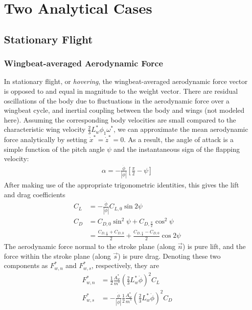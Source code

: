 \documentclass[11pt,letterpaper]{article}
\begin{document}
\section{Two Analytical Cases}

\subsection{Stationary Flight}\label{sec:analytical-hover}

\subsubsection{Wingbeat-averaged Aerodynamic Force}\label{sec:hover-force}

In stationary flight, or \emph{hovering}, the wingbeat-averaged
aerodynamic force vector is opposed to and equal in magnitude to
the weight vector. There are residual oscillations of the body
due to fluctuations in the aerodynamic force over a wingbeat cycle,
and inertial coupling between the body and wings (not modeled here).
Assuming the corresponding body velocities are small compared to the
characteristic wing velocity $\frac23 L_w^* \phi_1 \omega^*$, we can approximate
the mean aerodynamic force analytically by setting $\dot{x}^* = \dot{z}^* = 0$.
As a result, the angle of attack is a simple function of the pitch
angle $\psi$ and the instantaneous sign of the flapping velocity:
\begin{align}
    \alpha = - \frac{\dot{\phi}}{|\dot{\phi}|} \left[ \frac{\pi}{2} - \psi \right]
\end{align}
After making use of the appropriate trigonometric identities, this
gives the lift and drag coefficients
\begin{align}
    C_L &= -\frac{\dot{\phi}}{|\dot{\phi}|} C_{L,0} \sin 2\psi \\
    C_D &= C_{D,0} \sin^2 \psi + C_{D,\frac{\pi}{2}} \cos^2 \psi \nonumber \\
        &= \frac{C_{D,\frac{\pi}{2}} + C_{D,0}}{2} + \frac{C_{D,\frac{\pi}{2}} - C_{D,0}}{2} \cos 2\psi
\end{align}
The aerodynamic force normal to the stroke plane (along $\vec{n}$)
is pure lift, and the force within the stroke plane (along $\vec{s}$)
is pure drag. Denoting these two components as $F_{w,n}^*$ and $F_{w,s}^*$,
respectively, they are
\begin{align}
    F_{w,n}^* &= \frac12 \frac{A_w^*}{m^*} \left( \frac23 L_w^* \dot{\phi} \right)^2 C_L \\
    F_{w,s}^* &= - \frac{\dot{\phi}}{|\dot{\phi}|} \frac12 \frac{A_w^*}{m^*} \left( \frac23 L_w^* \dot{\phi} \right)^2 C_D
\end{align}
\end{document}
